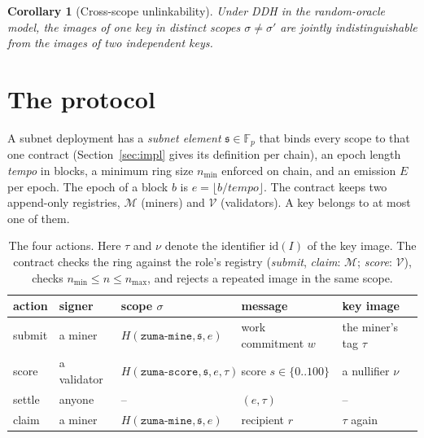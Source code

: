 \documentclass[11pt]{article}
\newtheorem{corollary}[theorem]{Corollary}
\theoremstyle{remark}
\newcommand{\Fp}{\mathbb{F}_p}
\newcommand{\Hs}{H}
\newcommand{\tg}{\tau}
\newcommand{\str}[1]{\texttt{#1}}
\begin{document}
\begin{corollary}[Cross-scope unlinkability]\label{cor:unlink}
Under DDH in the random-oracle model, the images of one key in distinct scopes $\sigma\neq\sigma'$ are jointly indistinguishable from the images of two independent keys.
\end{corollary}

\section{The protocol}\label{sec:protocol}

A subnet deployment has a \emph{subnet element} $\mathfrak{s}\in\Fp$ that binds every scope to that one contract (Section~\ref{sec:impl} gives its definition per chain), an epoch length \emph{tempo} in blocks, a minimum ring size $n_{\min}$ enforced on chain, and an emission $E$ per epoch. The epoch of a block $b$ is $e = \lfloor b / \mathit{tempo}\rfloor$. The contract keeps two append-only registries, $\mathcal{M}$ (miners) and $\mathcal{V}$ (validators). A key belongs to at most one of them.

\begin{table}[t]
\centering\small
\begin{tabular}{@{}lllll@{}}
\toprule
action & signer & scope $\sigma$ & message & key image \\
\midrule
submit & a miner & $\Hs(\str{zuma-mine},\mathfrak{s},e)$ & work commitment $w$ & the miner's tag $\tg$ \\
score & a validator & $\Hs(\str{zuma-score},\mathfrak{s},e,\tg)$ & score $s\in\{0..100\}$ & a nullifier $\nu$ \\
settle & anyone & -- & $(e,\tg)$ & -- \\
claim & a miner & $\Hs(\str{zuma-mine},\mathfrak{s},e)$ & recipient $r$ & $\tg$ again \\
\bottomrule
\end{tabular}
\caption{The four actions. Here $\tg$ and $\nu$ denote the identifier $\mathrm{id}(I)$ of the key image. The contract checks the ring against the role's registry (\emph{submit}, \emph{claim}: $\mathcal{M}$; \emph{score}: $\mathcal{V}$), checks $n_{\min}\le n\le n_{\max}$, and rejects a repeated image in the same scope.}
\label{tab:actions}
\end{table}
\end{document}
